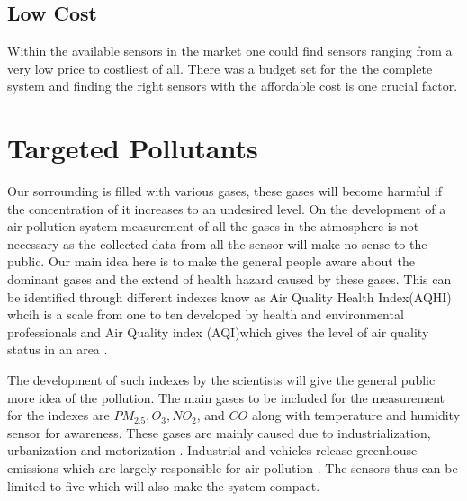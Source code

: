 \documentclass[11pt]{article}
\begin{document}
\subsection{Low Cost}

Within the available sensors in the market one could find sensors ranging from a very low price to costliest of all. There was a budget set for the the complete system and finding the right sensors with the affordable cost is one crucial factor.


\section*{Targeted Pollutants}

Our sorrounding is filled with various gases, these gases will become harmful if the concentration of it increases to an undesired level. On the development of a air pollution system measurement of all the gases in the atmosphere is not necessary as the collected data from all the sensor will make no sense to the public. Our main idea here is to make the general people aware about the dominant gases and the extend of health hazard caused by these gases. This can be identified through different indexes know as Air Quality Health Index(AQHI) whcih is a scale from one to ten developed by health and environmental professionals \cite{Questions} and Air Quality index (AQI)which gives the level of air quality status in an area \cite{Asha2017}.

\par 


The development of such indexes by the scientists will give the general public more idea of the pollution. The main gases to be included for the measurement for the indexes are  $PM_{2.5}, O_3, NO_2$, and $CO$ along with temperature and humidity sensor for awareness. These gases are mainly caused due to industrialization, urbanization and motorization \cite{Saha1952}. Industrial and vehicles release greenhouse emissions which are largely responsible for air pollution \cite{ internet}. The sensors thus can be limited to five which will also make the system compact.





\end{document}
